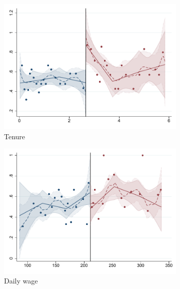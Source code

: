 \documentclass[oneside,11pt]{article}
\begin{document}
\begin{figure}[H]
     \caption{RD plots (Calculator treatment)}
    \label{rd_t2}
\begin{center}
\begin{subfigure}{0.31\textwidth}

\caption{Tenure}
        \includegraphics[width=\textwidth]{Figuras/rdplot_conflicto_arreglado_tenure_2.pdf}
    \end{subfigure}
    \begin{subfigure}{0.31\textwidth}
\caption{Daily wage}
        \includegraphics[width=\textwidth]{Figuras/rdplot_conflicto_arreglado_dw_2.pdf}
    \end{subfigure}        
    \begin{subfigure}{0.31\textwidth}

\end{subfigure}
\end{center}
\end{figure}
\end{document}
